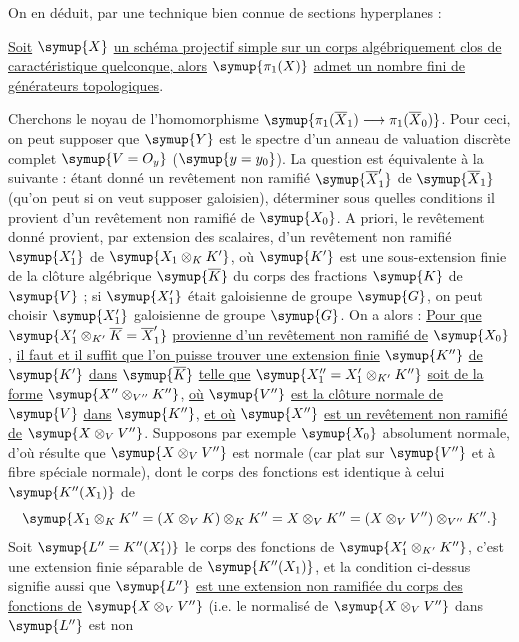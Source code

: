 On en déduit, par une technique bien connue de sections hyperplanes :

 \uline{Soit} $\symup{X}$ \uline{un schéma projectif simple sur un corps
algébriquement clos de caractéristique quelconque, alors} $\symup{\pi_1(X)}$ \uline{admet un
nombre fini de générateurs topologiques}.

Cherchons le noyau de l'homomorphisme
$\symup{\pi_1(\overline X_1)\longrightarrow\pi_1(\overline X_0)}$. Pour ceci, on peut
supposer que $\symup{Y}$ est le spectre d'un anneau de valuation discrète complet
$\symup{V=O_y}$ ($\symup{y=y_0}$). La question est équivalente à la suivante : étant donné
un revêtement non ramifié $\symup{\overline X'_1}$ de $\symup{\overline X_1}$ (qu'on peut si on
veut supposer galoisien), déterminer sous quelles conditions il provient d'un
revêtement non ramifié de $\symup{X_0}$. A priori, le revêtement donné
provient, par extension des scalaires, d'un revêtement non ramifié $\symup{X'_1}$ de
$\symup{X_1\otimes_K K'}$, où $\symup{K'}$ est une sous-extension finie de la clôture
algébrique $\symup{\overline K}$ du corps des fractions $\symup{K}$ de $\symup{V}$ ; si
$\symup{X'_1}$ était galoisienne de groupe $\symup{G}$, on peut choisir $\symup{X'_1}$
galoisienne de groupe $\symup{G}$. On a alors : \uline{Pour que}
$\symup{X'_1\otimes_{K'}\overline K=\overline X'_1}$ \uline{provienne d'un revêtement non
ramifié de} $\symup{X_0}$, \uline{il faut et il suffit que l'on puisse trouver une extension
finie} $\symup{K''}$ \uline{de} $\symup{K'}$ \uline{dans} $\symup{\overline K}$ \uline{telle que}
$\symup{X''_1=X'_1\otimes_{K'}K''}$ \uline{soit de la forme} $\symup{X''\otimes_{V''}K''}$, \uline{où} $\symup{V''}$
\uline{est la clôture normale de} $\symup{V}$ \uline{dans} $\symup{K''}$, \uline{et où} $\symup{X''}$ \uline{est un revêtement non
ramifié de} $\symup{X\otimes_VV''}$. Supposons par exemple $\symup{X_0}$ absolument normale,
d'où résulte que $\symup{X\otimes_VV''}$ est normale (car plat sur $\symup{V''}$ et à fibre
spéciale normale), dont le corps des fonctions est identique à celui
$\symup{K''(X_1)}$ de
\[
  \symup{X_1\otimes_KK''
  =(X\otimes_VK)\otimes_KK''
  =X\otimes_VK''
  =(X\otimes_VV'')\otimes_{V''}K''.}
\]
Soit $\symup{L''=K''(X'_1)}$ le corps des fonctions de $\symup{X'_1\otimes_{K'}K''}$, c'est
une extension finie séparable de $\symup{K''(X_1)}$, et la condition ci-dessus signifie
aussi que $\symup{L''}$ \uline{est une extension non ramifiée du corps des fonctions de}
$\symup{X\otimes_VV''}$ (i.e. le normalisé de $\symup{X\otimes_VV''}$ dans $\symup{L''}$ est non
